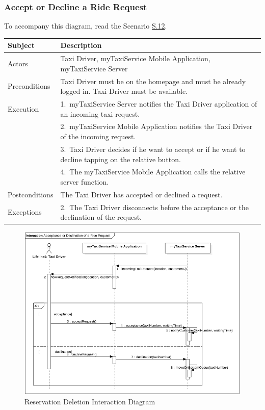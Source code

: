 \subsubsection{Accept or Decline a Ride Request}
			To accompany this diagram, read the Scenario \hyperref[sec:AcceptDeclineRequestScenario]{S.12}.

				\begin{table}[htpb]
					\centering
					\label{tab:AcceptDeclineRequestTable}
					\begin{tabularx}{\textwidth}{lp{9cm}}
						\hline
						\hline
							\textbf{Subject}
						& 
							\textbf{Description}\\
						\hline
							Actors	       &  Taxi Driver, myTaxiService Mobile Application, myTaxiService Server\\
						\hline
							Preconditions  &  Taxi Driver must be on the homepage and must be already logged in. Taxi Driver must be available.\\
						\hline
							Execution      &  1.~myTaxiService Server notifies the Taxi Driver application of an incoming taxi request.\\
										   &  2.~myTaxiService Mobile Application notifies the Taxi Driver of the incoming request.\\
										   &  3.~Taxi Driver decides if he want to accept or if he want to decline tapping on the relative button.\\
										   &  4.~The myTaxiService Mobile Application calls the relative server function.\\
						\hline
							Postconditions &  The Taxi Driver has accepted or declined a request.\\
						\hline
							Exceptions     &  2.~The Taxi Driver disconnects before the acceptance or the declination of the request.\\
									
						\hline
						\hline
					\end{tabularx}
				\end{table}
				
				\begin{figure}[H]
					\centering
					\includegraphics[width=\textwidth, scale=0.5]{IMG/InteractionDiagrams/AcceptDeclineRequest.png}
					\caption{Reservation Deletion Interaction Diagram}\label{sec:FigureAcceptDeclineRequest}
				\end{figure}